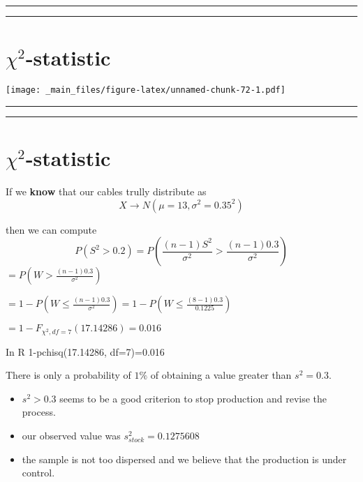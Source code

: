\documentclass[
]{book}
\begin{document}
\begin{center}\rule{0.5\linewidth}{0.5pt}\end{center}

\begin{center}\rule{0.5\linewidth}{0.5pt}\end{center}

\hypertarget{chi2-statistic}{%
\section{\texorpdfstring{\(\chi^2\)-statistic}{\textbackslash chi\^{}2-statistic}}\label{chi2-statistic}}

\texttt{[image: \_main\_files/figure-latex/unnamed-chunk-72-1.pdf]}

\begin{center}\rule{0.5\linewidth}{0.5pt}\end{center}

\begin{center}\rule{0.5\linewidth}{0.5pt}\end{center}

\hypertarget{chi2-statistic-1}{%
\section{\texorpdfstring{\(\chi^2\)-statistic}{\textbackslash chi\^{}2-statistic}}\label{chi2-statistic-1}}

If we \textbf{know} that our cables trully distribute as \[X \rightarrow N(\mu=13, \sigma^2=0.35^2)\]

then we can compute \[P(S^2 > 0.2)=P(\frac{(n-1)S^2}{\sigma^2} > \frac{(n-1)0.3}{\sigma^2})\]
\(=P(W > \frac{(n-1)0.3}{\sigma^2})\)

\(=1-P(W \leq \frac{(n-1)0.3}{\sigma^2})=1-P(W\leq \frac{(8-1)0.3}{0.1225})\)

\(= 1- F_{\chi^2,df=7}(17.14286)=0.016\)

In R
1-pchisq(17.14286, df=7)=0.016

There is only a probability of \(1\%\) of obtaining a value greater than \(s^2=0.3\).

\begin{itemize}
\item
  \(s^2>0.3\) seems to be a good criterion to stop production and revise the process.
\item
  our observed value was \(s^2_{stock}=0.1275608\)
\item
  the sample is not too dispersed and we believe that the production is under control.
\end{itemize}
\end{document}
